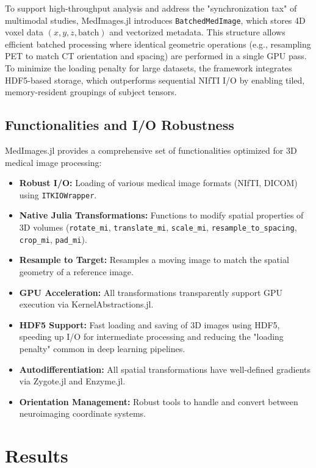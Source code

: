 \documentclass[10pt,letterpaper]{article}
\begin{document}
To support high-throughput analysis and address the "synchronization tax" of multimodal studies, MedImages.jl introduces \texttt{BatchedMedImage}, which stores 4D voxel data $(x, y, z, \text{batch})$ and vectorized metadata. This structure allows efficient batched processing where identical geometric operations (e.g., resampling PET to match CT orientation and spacing) are performed in a single GPU pass. To minimize the loading penalty for large datasets, the framework integrates HDF5-based storage, which outperforms sequential NIfTI I/O by enabling tiled, memory-resident groupings of subject tensors.

\subsection*{Functionalities and I/O Robustness}
MedImages.jl provides a comprehensive set of functionalities optimized for 3D medical image processing:
\begin{itemize}
    \item \textbf{Robust I/O:} Loading of various medical image formats (NIfTI, DICOM) using \texttt{ITKIOWrapper}.
    \item \textbf{Native Julia Transformations:} Functions to modify spatial properties of 3D volumes (\texttt{rotate\_mi}, \texttt{translate\_mi}, \texttt{scale\_mi}, \texttt{resample\_to\_spacing}, \texttt{crop\_mi}, \texttt{pad\_mi}).
    \item \textbf{Resample to Target:} Resamples a moving image to match the spatial geometry of a reference image.
    \item \textbf{GPU Acceleration:} All transformations transparently support GPU execution via KernelAbstractions.jl.
    \item \textbf{HDF5 Support:} Fast loading and saving of 3D images using HDF5, speeding up I/O for intermediate processing and reducing the "loading penalty" common in deep learning pipelines.
    \item \textbf{Autodifferentiation:} All spatial transformations have well-defined gradients via Zygote.jl and Enzyme.jl.
    \item \textbf{Orientation Management:} Robust tools to handle and convert between neuroimaging coordinate systems.
\end{itemize}

\section*{Results}
\end{document}
